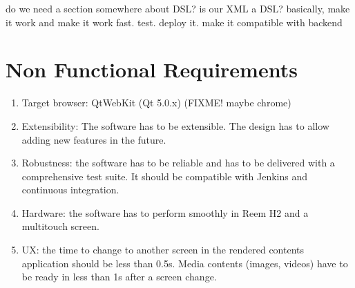 do we need a section somewhere about DSL? is our XML a DSL?
basically, make it work and make it work fast. test. deploy it. make it compatible with backend

\section{Non Functional Requirements}
\begin{enumerate}
    \item Target browser: QtWebKit (Qt 5.0.x) (FIXME! maybe chrome)
    \item Extensibility: The software has to be extensible. The design has to allow adding new features in the future.
    \item Robustness: the software has to be reliable and has to be delivered with a comprehensive test suite. It should be compatible with Jenkins and continuous integration.
    \item Hardware: the software has to perform smoothly in Reem H2 and a multitouch screen.
    \item UX: the time to change to another screen in the rendered contents application should be less than 0.5s. Media contents (images, videos) have to be ready in less than 1s after a screen change. 
\end{enumerate}
